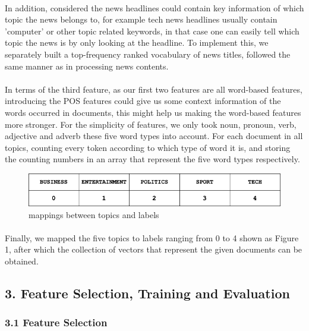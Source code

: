 \documentclass{article}
\begin{document}
\paragraph{}
In addition, considered the news headlines could contain key information of which topic the news belongs to, for example tech news headlines usually contain 'computer' or other topic related keywords, in that case one can easily tell which topic the news is by only looking at the headline. To implement this, we separately built a top-frequency ranked vocabulary of news titles, followed the same manner as in processing news contents.
\paragraph{}
In terms of the third feature, as our first two features are all word-based features, introducing the POS features could give us some context information of the words occurred in documents, this might help us making the word-based features more stronger. For the simplicity of features, we only took noun, pronoun, verb, adjective and adverb these five word types into account. For each document in all topics, counting every token according to which type of word it is, and storing the counting numbers in an array that represent the five word types respectively.
\renewcommand{\thefigure}{1.}
		\begin{figure}[htbp]
				\centerline{\includegraphics[scale=.5]{./topic_label_relation.png}}
					\caption{mappings between topics and labels}
				\end{figure}
\paragraph{}
Finally, we mapped the five topics to labels ranging from 0 to 4 shown as Figure 1, after which the collection of vectors that represent the given documents can be obtained.

\subsection*{3. Feature Selection, Training and Evaluation}
\subsubsection*{3.1 Feature Selection}
\end{document}
